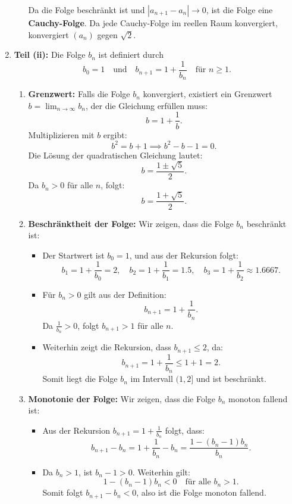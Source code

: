 \documentclass[11pt]{article}
\begin{document}
\begin{enumerate}
\begin{enumerate}
        Da die Folge beschränkt ist und \( |a_{n+1} - a_n| \to 0 \), ist die Folge eine \textbf{Cauchy-Folge}. Da jede Cauchy-Folge im reellen Raum konvergiert, konvergiert \( (a_n) \) gegen \( \sqrt{2} \).
    \end{enumerate}
\item \textbf{Teil (ii):} Die Folge $b_n$ ist definiert durch
\[
b_0 = 1 \quad \text{und} \quad b_{n+1} = 1 + \frac{1}{b_n} \quad \text{für } n \geq 1.
\]

\begin{enumerate}
    \item \textbf{Grenzwert:} Falls die Folge $b_n$ konvergiert, existiert ein Grenzwert $b = \lim_{n \to \infty} b_n$, der die Gleichung erfüllen muss:
    \[
    b = 1 + \frac{1}{b}.
    \]
    Multiplizieren mit $b$ ergibt:
    \[
    b^2 = b + 1 \implies b^2 - b - 1 = 0.
    \]
    Die Lösung der quadratischen Gleichung lautet:
    \[
    b = \frac{1 \pm \sqrt{5}}{2}.
    \]
    Da $b_n > 0$ für alle $n$, folgt:
    \[
    b = \frac{1 + \sqrt{5}}{2}.
    \]

    \item \textbf{Beschränktheit der Folge:} Wir zeigen, dass die Folge $b_n$ beschränkt ist:
    \begin{itemize}
        \item Der Startwert ist $b_0 = 1$, und aus der Rekursion folgt:
        \[
        b_1 = 1 + \frac{1}{b_0} = 2, \quad b_2 = 1 + \frac{1}{b_1} = 1.5, \quad b_3 = 1 + \frac{1}{b_2} \approx 1.6667.
        \]
        \item Für $b_n > 0$ gilt aus der Definition:
        \[
        b_{n+1} = 1 + \frac{1}{b_n}.
        \]
        Da \( \frac{1}{b_n} > 0 \), folgt \( b_{n+1} > 1 \) für alle \( n \).
        \item Weiterhin zeigt die Rekursion, dass \( b_{n+1} \leq 2 \), da:
        \[
        b_{n+1} = 1 + \frac{1}{b_n} \leq 1 + 1 = 2.
        \]
        Somit liegt die Folge \( b_n \) im Intervall \( (1, 2] \) und ist beschränkt.

    \end{itemize}

    \item \textbf{Monotonie der Folge:} Wir zeigen, dass die Folge \( b_n \) monoton fallend ist:
    \begin{itemize}
        \item Aus der Rekursion \( b_{n+1} = 1 + \frac{1}{b_n} \) folgt, dass:
        \[
        b_{n+1} - b_n = 1 + \frac{1}{b_n} - b_n = \frac{1 - (b_n - 1)b_n}{b_n}.
        \]
        \item Da \( b_n > 1 \), ist \( b_n - 1 > 0 \). Weiterhin gilt:
        \[
        1 - (b_n - 1)b_n < 0 \quad \text{für alle } b_n > 1.
        \]
        Somit folgt \( b_{n+1} - b_n < 0 \), also ist die Folge monoton fallend.
    \end{itemize}


\end{enumerate}
\end{enumerate}
\end{document}
